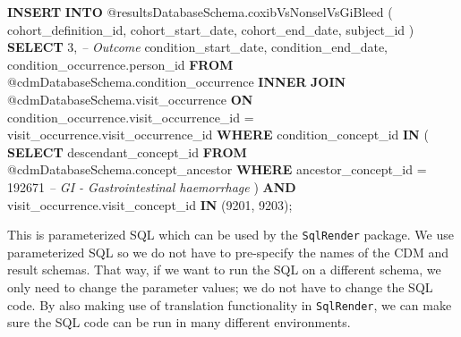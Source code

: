 \documentclass[]{article}
\newenvironment{Shaded}{\begin{snugshade}}{\end{snugshade}}
\newcommand{\CommentTok}[1]{\textcolor[rgb]{0.56,0.35,0.01}{\textit{#1}}}
\newcommand{\DataTypeTok}[1]{\textcolor[rgb]{0.13,0.29,0.53}{#1}}
\newcommand{\DecValTok}[1]{\textcolor[rgb]{0.00,0.00,0.81}{#1}}
\newcommand{\KeywordTok}[1]{\textcolor[rgb]{0.13,0.29,0.53}{\textbf{#1}}}
\newcommand{\NormalTok}[1]{#1}
\newcommand{\OperatorTok}[1]{\textcolor[rgb]{0.81,0.36,0.00}{\textbf{#1}}}
\newcommand{\StringTok}[1]{\textcolor[rgb]{0.31,0.60,0.02}{#1}}
\begin{document}
\begin{Shaded}
\begin{Highlighting}[]
\KeywordTok{INSERT} \KeywordTok{INTO}\NormalTok{ @resultsDatabaseSchema.coxibVsNonselVsGiBleed (}
\NormalTok{    cohort_definition_id,}
\NormalTok{    cohort_start_date,}
\NormalTok{    cohort_end_date,}
\NormalTok{    subject_id}
\NormalTok{    )}
\KeywordTok{SELECT} \DecValTok{3}\NormalTok{, }\CommentTok{-- Outcome}
\NormalTok{    condition_start_date,}
\NormalTok{    condition_end_date,}
\NormalTok{    condition_occurrence.person_id}
\KeywordTok{FROM}\NormalTok{ @cdmDatabaseSchema.condition_occurrence}
\KeywordTok{INNER} \KeywordTok{JOIN}\NormalTok{ @cdmDatabaseSchema.visit_occurrence}
    \KeywordTok{ON}\NormalTok{ condition_occurrence.visit_occurrence_id = visit_occurrence.visit_occurrence_id}
\KeywordTok{WHERE}\NormalTok{ condition_concept_id }\KeywordTok{IN}\NormalTok{ (}
        \KeywordTok{SELECT}\NormalTok{ descendant_concept_id}
        \KeywordTok{FROM}\NormalTok{ @cdmDatabaseSchema.concept_ancestor}
        \KeywordTok{WHERE}\NormalTok{ ancestor_concept_id = }\DecValTok{192671} \CommentTok{-- GI - Gastrointestinal haemorrhage}
\NormalTok{        )}
    \KeywordTok{AND}\NormalTok{ visit_occurrence.visit_concept_id }\KeywordTok{IN}\NormalTok{ (}\DecValTok{9201}\NormalTok{, }\DecValTok{9203}\NormalTok{);}
\end{Highlighting}
\end{Shaded}

This is parameterized SQL which can be used by the \texttt{SqlRender}
package. We use parameterized SQL so we do not have to pre-specify the
names of the CDM and result schemas. That way, if we want to run the SQL
on a different schema, we only need to change the parameter values; we
do not have to change the SQL code. By also making use of translation
functionality in \texttt{SqlRender}, we can make sure the SQL code can
be run in many different environments.

\begin{Shaded}
\end{Shaded}
\end{document}
